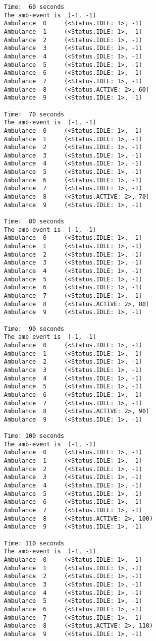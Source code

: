 \documentclass[11pt]{article}
\begin{document}
\begin{Verbatim}[commandchars=\\\{\}]
Time:  60 seconds
The amb-event is  (-1, -1)
Ambulance  0	 (<Status.IDLE: 1>, -1)
Ambulance  1	 (<Status.IDLE: 1>, -1)
Ambulance  2	 (<Status.IDLE: 1>, -1)
Ambulance  3	 (<Status.IDLE: 1>, -1)
Ambulance  4	 (<Status.IDLE: 1>, -1)
Ambulance  5	 (<Status.IDLE: 1>, -1)
Ambulance  6	 (<Status.IDLE: 1>, -1)
Ambulance  7	 (<Status.IDLE: 1>, -1)
Ambulance  8	 (<Status.ACTIVE: 2>, 60)
Ambulance  9	 (<Status.IDLE: 1>, -1)

Time:  70 seconds
The amb-event is  (-1, -1)
Ambulance  0	 (<Status.IDLE: 1>, -1)
Ambulance  1	 (<Status.IDLE: 1>, -1)
Ambulance  2	 (<Status.IDLE: 1>, -1)
Ambulance  3	 (<Status.IDLE: 1>, -1)
Ambulance  4	 (<Status.IDLE: 1>, -1)
Ambulance  5	 (<Status.IDLE: 1>, -1)
Ambulance  6	 (<Status.IDLE: 1>, -1)
Ambulance  7	 (<Status.IDLE: 1>, -1)
Ambulance  8	 (<Status.ACTIVE: 2>, 70)
Ambulance  9	 (<Status.IDLE: 1>, -1)

Time:  80 seconds
The amb-event is  (-1, -1)
Ambulance  0	 (<Status.IDLE: 1>, -1)
Ambulance  1	 (<Status.IDLE: 1>, -1)
Ambulance  2	 (<Status.IDLE: 1>, -1)
Ambulance  3	 (<Status.IDLE: 1>, -1)
Ambulance  4	 (<Status.IDLE: 1>, -1)
Ambulance  5	 (<Status.IDLE: 1>, -1)
Ambulance  6	 (<Status.IDLE: 1>, -1)
Ambulance  7	 (<Status.IDLE: 1>, -1)
Ambulance  8	 (<Status.ACTIVE: 2>, 80)
Ambulance  9	 (<Status.IDLE: 1>, -1)

Time:  90 seconds
The amb-event is  (-1, -1)
Ambulance  0	 (<Status.IDLE: 1>, -1)
Ambulance  1	 (<Status.IDLE: 1>, -1)
Ambulance  2	 (<Status.IDLE: 1>, -1)
Ambulance  3	 (<Status.IDLE: 1>, -1)
Ambulance  4	 (<Status.IDLE: 1>, -1)
Ambulance  5	 (<Status.IDLE: 1>, -1)
Ambulance  6	 (<Status.IDLE: 1>, -1)
Ambulance  7	 (<Status.IDLE: 1>, -1)
Ambulance  8	 (<Status.ACTIVE: 2>, 90)
Ambulance  9	 (<Status.IDLE: 1>, -1)

Time: 100 seconds
The amb-event is  (-1, -1)
Ambulance  0	 (<Status.IDLE: 1>, -1)
Ambulance  1	 (<Status.IDLE: 1>, -1)
Ambulance  2	 (<Status.IDLE: 1>, -1)
Ambulance  3	 (<Status.IDLE: 1>, -1)
Ambulance  4	 (<Status.IDLE: 1>, -1)
Ambulance  5	 (<Status.IDLE: 1>, -1)
Ambulance  6	 (<Status.IDLE: 1>, -1)
Ambulance  7	 (<Status.IDLE: 1>, -1)
Ambulance  8	 (<Status.ACTIVE: 2>, 100)
Ambulance  9	 (<Status.IDLE: 1>, -1)

Time: 110 seconds
The amb-event is  (-1, -1)
Ambulance  0	 (<Status.IDLE: 1>, -1)
Ambulance  1	 (<Status.IDLE: 1>, -1)
Ambulance  2	 (<Status.IDLE: 1>, -1)
Ambulance  3	 (<Status.IDLE: 1>, -1)
Ambulance  4	 (<Status.IDLE: 1>, -1)
Ambulance  5	 (<Status.IDLE: 1>, -1)
Ambulance  6	 (<Status.IDLE: 1>, -1)
Ambulance  7	 (<Status.IDLE: 1>, -1)
Ambulance  8	 (<Status.ACTIVE: 2>, 110)
Ambulance  9	 (<Status.IDLE: 1>, -1)


\end{Verbatim}
\end{document}
